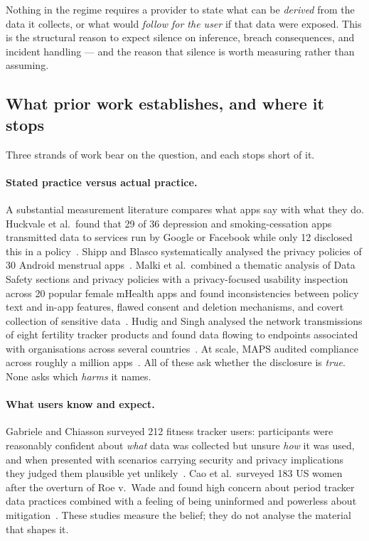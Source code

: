 Nothing in the regime requires a provider to state what can be \emph{derived}
from the data it collects, or what would \emph{follow for the user} if that data
were exposed. This is the structural reason to expect silence on inference,
breach consequences, and incident handling --- and the reason that silence is
worth measuring rather than assuming.

\subsection{What prior work establishes, and where it stops}

Three strands of work bear on the question, and each stops short of it.

\paragraph{Stated practice versus actual practice.}
A substantial measurement literature compares what apps say with what they do.
Huckvale et al.\ found that 29 of 36 depression and smoking-cessation apps
transmitted data to services run by Google or Facebook while only 12 disclosed
this in a policy~\parencite{huckvale2019assessment}. Shipp and Blasco
systematically analysed the privacy policies of 30 Android menstrual
apps~\parencite{shipp2020period}. Malki et al.\ combined a thematic analysis of
Data Safety sections and privacy policies with a privacy-focused usability
inspection across 20 popular female mHealth apps and found inconsistencies
between policy text and in-app features, flawed consent and deletion mechanisms,
and covert collection of sensitive data~\parencite{malki2024exploring}. Hudig and
Singh analysed the network transmissions of eight fertility tracker products and
found data flowing to endpoints associated with organisations across several
countries~\parencite{hudig2025intimate}. At scale, MAPS audited
compliance across roughly a million apps~\parencite{zimmeck2019maps}. All of
these ask whether the disclosure is \emph{true}. None asks which \emph{harms} it
names.

\paragraph{What users know and expect.}
Gabriele and Chiasson surveyed 212 fitness tracker users: participants were
reasonably confident about \emph{what} data was collected but unsure \emph{how}
it was used, and when presented with scenarios carrying security and privacy
implications they judged them plausible yet
unlikely~\parencite{gabriele2020understanding}. Cao et al.\ surveyed 183 US
women after the overturn of Roe v.\ Wade and found high concern about period
tracker data practices combined with a feeling of being uninformed and powerless
about mitigation~\parencite{cao2024deleted}. These studies measure the belief;
they do not analyse the material that shapes it.

